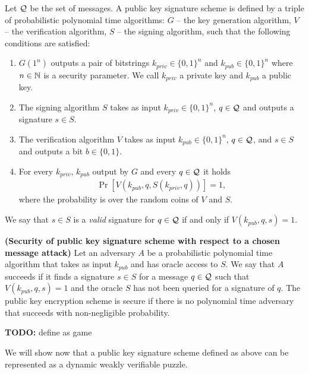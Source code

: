 \begin{definition}
Let $\mathcal{Q}$ be the set of messages. A \textnormal{public key signature scheme} is defined by a triple of probabilistic polynomial time algorithms:
$G$ -- the key generation algorithm,
$V$ -- the verification algorithm,
$S$ -- the signing algorithm,
such that the following conditions are satisfied:
\begin{enumerate}[-]
  \item $G(1^n)$ outputs a pair of bitstrings $k_{priv} \in \{0,1\}^{n}$ and $k_{pub} \in \{0,1\}^{n}$ where $n \in \mathbb{N}$ is a security parameter.
    We call $k_{priv}$ a private key and $k_{pub}$ a public key.
  \item The signing algorithm $S$ takes as input $k_{priv} \in \{0,1\}^{n}$, $q \in \mathcal{Q}$ and outputs a signature $s \in S$.
  \item The verification algorithm $V$ takes as input $k_{pub} \in \{0,1\}^{n}$, $q \in \mathcal{Q}$, and $s \in S$ and outputs a bit $b \in \{0,1\}$.
  \item For every $k_{priv}$, $k_{pub}$ output by $G$ and every $q \in \mathcal{Q}$ it holds
    \begin{align*}
      \Pr[V(k_{pub}, q, S(k_{priv}, q))] = 1,
    \end{align*}
    where the probability is over the random coins of $V$ and $S$.
\end{enumerate}
\end{definition}
We say that $s \in S$ is a \textit{valid} signature for $q \in \mathcal{Q}$ if and only if $V(k_{pub}, q, s) = 1$.
%
%
\begin{definition}\textbf{(Security of public key signature scheme with respect to a chosen message attack)}
Let an \textnormal{adversary} $A$ be a probabilistic polynomial time algorithm that takes as input $k_{pub}$ and has oracle access to $S$.
We say that $A$ \textnormal{succeeds} if it finds a signature $s \in S$ for a message $q \in \mathcal{Q}$ such that $V(k_{pub}, q, s) = 1$
and the oracle $S$ has not been queried for a signature of $q$.
The public key encryption scheme is \textnormal{secure} if there is no polynomial time adversary that succeeds with non-negligible probability.
\end{definition}
%
\begin{todo}
  \textbf{TODO:} define as game
\end{todo}
We will show now that a public key signature scheme defined as above can be represented as a dynamic weakly verifiable puzzle.

